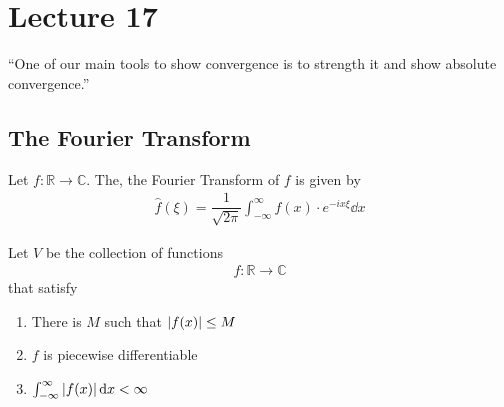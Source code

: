 \section{Lecture 17}
``One of our main tools to show convergence is to strength it and show absolute convergence.''
\subsection{The Fourier Transform}
\begin{definition}
    Let $f: \mathbb{R}\to\mathbb{C}$. The, the Fourier Transform of $f$ is given by
    \begin{align}
        \hat{f}(\xi) = \dfrac{1}{\sqrt{2\pi}} \int_{-\infty}^\infty f(x) \cdot e^{-ix\xi} \dd{x}
    \end{align}
\end{definition}
\begin{definition}
    Let $V$ be the collection of functions
    \begin{align}
        f: \mathbb{R}\to\mathbb{C}
    \end{align}
    that satisfy
    \begin{enumerate}
        \item There is $M$ such that $\abs{f(x)} \le M$
        \item $f$ is piecewise differentiable
        \item $\int_{-\infty}^\infty \abs{f(x)} \dd{x} < \infty$
    \end{enumerate}
\end{definition}

